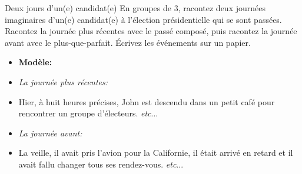 \begin{frame}{Deux jours d'un(e) candidat(e)}
  En groupes de 3, racontez deux journées imaginaires d'un(e) candidat(e) à l'élection présidentielle qui se sont passées.
  Racontez la journée plus récentes \alert{avec le passé composé}, puis racontez la journée avant \alert{avec le plus-que-parfait}.
  Écrivez les événements sur un papier.
  \begin{itemize}
    \item[] \textbf{Modèle:}
    \item[] \emph{La journée plus récentes:}
    \item Hier, à huit heures précises, John est descendu dans un petit café pour rencontrer un groupe d'électeurs. \emph{etc}...
    \item[] \emph{La journée avant:}
    \item La veille, il avait pris l'avion pour la Californie, il était arrivé en retard et il avait fallu changer tous ses rendez-vous. \emph{etc}...
  \end{itemize}
\end{frame}